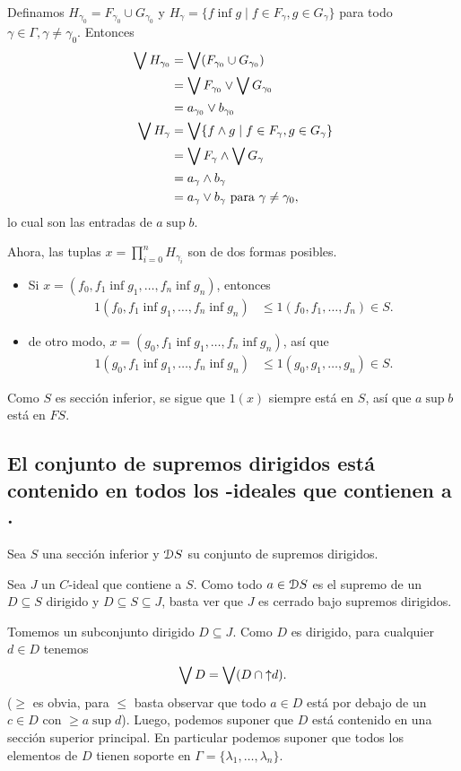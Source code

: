 Definamos $H_{\gamma_0}=F_{\gamma_0}\cup G_{\gamma_0}$ y
$H_\gamma = \{f\inf g\mid f\in F_\gamma,g\in G_\gamma\}$ para
todo $\gamma\in\Gamma,\gamma\neq\gamma_0$.
Entonces
\begin{align*}
  \bigvee H_{\gamma_0}
  &= \bigvee(F_{\gamma_0}\cup G_{\gamma_0}) \\
  &= \bigvee F_{\gamma_0} \vee \bigvee G_{\gamma_0} \\
  &= a_{\gamma_0} \vee b_{\gamma_0}
  \\
  \bigvee H_\gamma
  &= \bigvee\{f\wedge g \mid f\in F_\gamma, g\in G_\gamma\} \\
  &= \bigvee F_\gamma \wedge \bigvee G_\gamma \\
  &= a_\gamma \wedge b_\gamma \\
  &= a_\gamma\vee b_\gamma
  \text{ para } \gamma\neq\gamma_0,
\end{align*}
lo cual son las entradas de $a\sup b$.

Ahora, las tuplas $x=\prod_{i=0}^n H_{\gamma_i}$ son de
dos formas posibles.
\begin{itemize}
  \item Si $x=(f_0,f_1\inf g_1,\dots,f_n\inf g_n)$,
  entonces
  \begin{align*}
    1(f_0,f_1\inf g_1,\dots,f_n\inf g_n)
    &\leq 1(f_0,f_1,\dots,f_n) \in S.
  \end{align*}
  \item de otro modo, $x=(g_0,f_1\inf g_1,\dots,f_n\inf g_n)$,
  así que
  \begin{align*}
    1(g_0,f_1\inf g_1,\dots,f_n\inf g_n)
    &\leq 1(g_0,g_1,\dots,g_n)\in S.
  \end{align*}
\end{itemize}
Como $S$ es sección inferior, se sigue que $1(x)$ siempre está en
$S$, así que $a\sup b$ está en $FS$.

\subsection{El conjunto de supremos dirigidos  está contenido en todos los -ideales que contienen a .}

Sea $S$ una sección inferior y $\mathcal D S$ su conjunto de supremos
dirigidos.

Sea $J$ un $C$-ideal que contiene a $S$.
Como todo $a\in\mathcal D S$ es el supremo de un $D\subseteq S$ dirigido
y $D\subseteq S\subseteq J$, basta ver que $J$ es cerrado bajo
supremos dirigidos.

Tomemos un subconjunto dirigido $D\subseteq J$.
Como $D$ es dirigido, para cualquier $d\in D$ tenemos
\[
  \bigvee D = \bigvee(D\cap{\uparrow}d)
.\]
($\geq$ es obvia, para $\leq$ basta observar que todo $a\in D$
está por debajo de un $c\in D$ con $\geq a\sup d$).
Luego, podemos suponer que $D$ está contenido en una sección
superior principal.
En particular podemos suponer que todos los elementos de $D$
tienen soporte en $\Gamma=\{\lambda_1,\dots,\lambda_n\}$.

